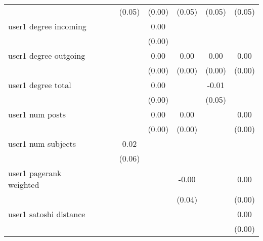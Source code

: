 \begin{table*}
\begin{center}
\begin{tabular}{lccccccc}
                                               &          &            & (0.05)  & (0.00)  & (0.05)   & (0.05)             & (0.05)  \\
user1 degree incoming                          &          &            &         & 0.00    &          &                    &         \\
                                               &          &            &         & (0.00)  &          &                    &         \\
user1 degree outgoing                          &          &            &         & 0.00    & 0.00     & 0.00               & 0.00    \\
                                               &          &            &         & (0.00)  & (0.00)   & (0.00)             & (0.00)  \\
user1 degree total                             &          &            &         & 0.00    &          & -0.01              &         \\
                                               &          &            &         & (0.00)  &          & (0.05)             &         \\
user1 num posts                                &          &            &         & 0.00    & 0.00     &                    & 0.00    \\
                                               &          &            &         & (0.00)  & (0.00)   &                    & (0.00)  \\
user1 num subjects                             &          &            & 0.02    &         &          &                    &         \\
                                               &          &            & (0.06)  &         &          &                    &         \\
user1 pagerank weighted                        &          &            &         &         & -0.00    &                    & 0.00    \\
                                               &          &            &         &         & (0.04)   &                    & (0.00)  \\
user1 satoshi distance                         &          &            &         &         &          &                    & 0.00    \\
                                               &          &            &         &         &          &                    & (0.00)  \\

\end{tabular}
\end{center}
\end{table*}
